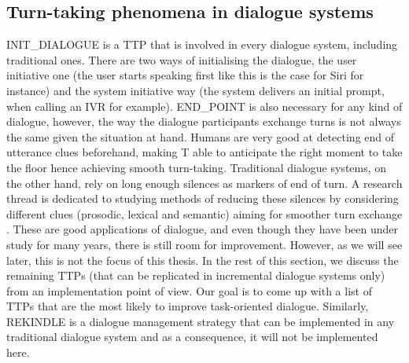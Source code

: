      \subsection{Turn-taking phenomena in dialogue systems}
		
          INIT\_DIALOGUE is a TTP that is involved in every dialogue system, including traditional ones. There are two ways of initialising the dialogue, the user initiative one (the user starts speaking first like this is the case for Siri for instance) and the system initiative way (the system delivers an initial prompt, when calling an IVR for example). END\_POINT is also necessary for any kind of dialogue, however, the way the dialogue participants exchange turns is not always the same given the situation at hand. Humans are very good at detecting end of utterance clues beforehand, making T able to anticipate the right moment to take the floor hence achieving smooth turn-taking. Traditional dialogue systems, on the other hand, rely on long enough silences as markers of end of turn. A research thread is dedicated to studying methods of reducing these silences by considering different clues (prosodic, lexical and semantic) aiming for smoother turn exchange \cite{Raux2008}. These are good applications of dialogue, and even though they have been under study for many years, there is still room for improvement. However, as we will see later, this is not the focus of this thesis. In the rest of this section, we discuss the remaining TTPs (that can be replicated in incremental dialogue systems only) from an implementation point of view. Our goal is to come up with a list of TTPs that are the most likely to improve task-oriented dialogue. Similarly, REKINDLE is a dialogue management strategy that can be implemented in any traditional dialogue system and as a consequence, it will not be implemented here.


